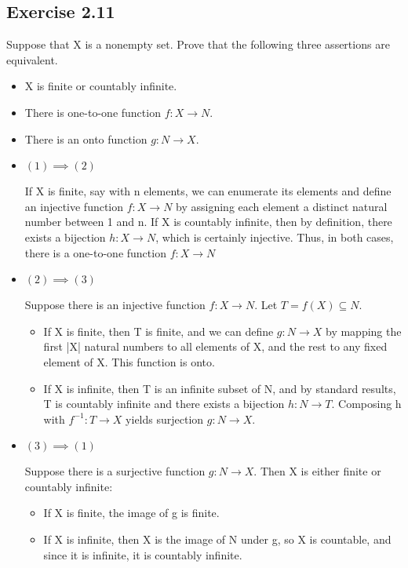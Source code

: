 \documentclass[12pt]{article}
\begin{document}
		\subsection*{Exercise 2.11}
			Suppose that X is a nonempty set. Prove that the following three assertions are equivalent.
			\begin{itemize}
				\item X is finite or countably infinite.
				\item There is one-to-one function $f: X \rightarrow N$.
				\item There is an onto function $g: N \rightarrow X$.
			\end{itemize}
			\begin{itemize}
				\item $(1) \implies (2)$
				
					If X is finite, say with n elements, we can enumerate its elements and define an injective function $f:X \rightarrow N$ by assigning each element a distinct natural number between 1 and n. If X is countably infinite, then by definition, there exists a bijection $h:X \rightarrow N$, which is certainly injective. Thus, in both cases, there is a one-to-one function $f:X \rightarrow N$
				\item $(2) \implies (3)$
				
					Suppose there is an injective function $f:X \rightarrow N$. Let $T = f(X) \subseteq N$.
					\begin{itemize}
						\item If X is finite, then T is finite, and we can define $g: N \rightarrow X$ by mapping the first |X| natural numbers to all elements of X, and the rest to any fixed element of X. This function is onto.
						\item If X is infinite, then T is an infinite subset of N, and by standard results, T is countably infinite and there exists a bijection $h: N \rightarrow T$. Composing h with $f^{-1}: T \rightarrow X$ yields surjection $g: N \rightarrow X$.
					\end{itemize}
				\item $(3) \implies (1)$
				
					Suppose there is a surjective function $g: N \rightarrow X$. Then X is either finite or countably infinite:
					\begin{itemize}
						\item If X is finite, the image of g is finite.
						\item If X is infinite, then X is the image of N under g, so X is countable, and since it is infinite, it is countably infinite.
					\end{itemize}
			\end{itemize}
\end{document}
